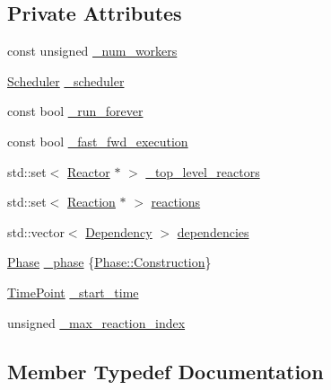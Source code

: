 \subsection*{Private Attributes}
\begin{DoxyCompactItemize}
\item 
const unsigned \hyperlink{classreactor_1_1Environment_a01fac164f06a9f97bb2ee5b0b6d4a368}{\+\_\+num\+\_\+workers}
\item 
\hyperlink{classreactor_1_1Scheduler}{Scheduler} \hyperlink{classreactor_1_1Environment_ae07319eb6bc85a9c00ac324db4891217}{\+\_\+scheduler}
\item 
const bool \hyperlink{classreactor_1_1Environment_ad842507a720c670f9a51dbee020ed08b}{\+\_\+run\+\_\+forever}
\item 
const bool \hyperlink{classreactor_1_1Environment_ad49bd4d74a5fdf2132a4ca9933135b99}{\+\_\+fast\+\_\+fwd\+\_\+execution}
\item 
std\+::set$<$ \hyperlink{classreactor_1_1Reactor}{Reactor} $\ast$ $>$ \hyperlink{classreactor_1_1Environment_a15707bfeefc0200d2956e3b52c8270db}{\+\_\+top\+\_\+level\+\_\+reactors}
\item 
std\+::set$<$ \hyperlink{classreactor_1_1Reaction}{Reaction} $\ast$ $>$ \hyperlink{classreactor_1_1Environment_abaca5b55047bbf45f4280eeeb8cd38c4}{reactions}
\item 
std\+::vector$<$ \hyperlink{classreactor_1_1Environment_aefeb24b3f7a321c7dc8309cac1ed176d}{Dependency} $>$ \hyperlink{classreactor_1_1Environment_ac67e4fbe9d7365e4570fc9667c003f41}{dependencies}
\item 
\hyperlink{classreactor_1_1Environment_a2f0bcf10490e174246fc14b456fb0755}{Phase} \hyperlink{classreactor_1_1Environment_a15d6118f5ae312ad7665418969cc831a}{\+\_\+phase} \{\hyperlink{classreactor_1_1Environment_a2f0bcf10490e174246fc14b456fb0755a2a0d30cb1153031c3dfc239c6e0407ea}{Phase\+::\+Construction}\}
\item 
\hyperlink{namespacereactor_ad950f8d1a46612500286a4af0f167080}{Time\+Point} \hyperlink{classreactor_1_1Environment_adcc50c30d8fb1ad1dca3033e6819e3b8}{\+\_\+start\+\_\+time}
\item 
unsigned \hyperlink{classreactor_1_1Environment_aaacf54f45077c2c90e2c2ba628f088e8}{\+\_\+max\+\_\+reaction\+\_\+index}
\end{DoxyCompactItemize}


\subsection{Member Typedef Documentation}
\mbox{\label{classreactor_1_1Environment_aefeb24b3f7a321c7dc8309cac1ed176d}} 
